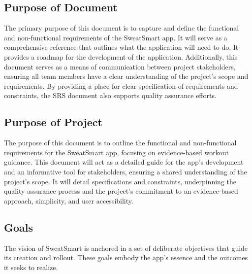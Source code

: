 \documentclass[12pt]{article}
\begin{document}
\subsection{Purpose of Document}
The primary purpose of this document is to capture and define the functional and non-functional requirements of the SweatSmart app. It will serve as a comprehensive reference that outlines what the application will need to do. It provides a roadmap for the development of the application. Additionally, this document serves as a means of communication between project stakeholders, ensuring all team members have a clear understanding of the project’s scope and requirements. By providing a place for clear specification of requirements and constraints, the SRS document also supports quality assurance efforts.

\subsection{Purpose of Project}
The purpose of this document is to outline the functional and non-functional requirements for the SweatSmart app, focusing on evidence-based workout guidance. This document will act as a detailed guide for the app's development and an informative tool for stakeholders, ensuring a shared understanding of the project's scope. It will detail specifications and constraints, underpinning the quality assurance process and the project's commitment to an evidence-based approach, simplicity, and user accessibility.

\subsection{Goals}
The vision of SweatSmart is anchored in a set of deliberate objectives that guide its creation and rollout. These goals embody the app's essence and the outcomes it seeks to realize.
\end{document}
